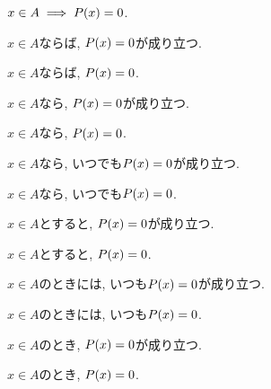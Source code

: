 \item $x \in A\implies P(x)=0$.
\item $x\in A$ならば, $P(x)=0$が成り立つ.
\item $x\in A$ならば, $P(x)=0$.
\item $x\in A$なら, $P(x)=0$が成り立つ.
\item $x\in A$なら, $P(x)=0$.
\item $x\in A$なら, いつでも$P(x)=0$が成り立つ.
\item $x\in A$なら, いつでも$P(x)=0$.
\item $x\in A$とすると, $P(x)=0$が成り立つ.
\item $x\in A$とすると, $P(x)=0$.
\item $x\in A$のときには, いつも$P(x)=0$が成り立つ.
\item $x\in A$のときには, いつも$P(x)=0$.
\item $x\in A$のとき, $P(x)=0$が成り立つ.
\item $x\in A$のとき, $P(x)=0$.
